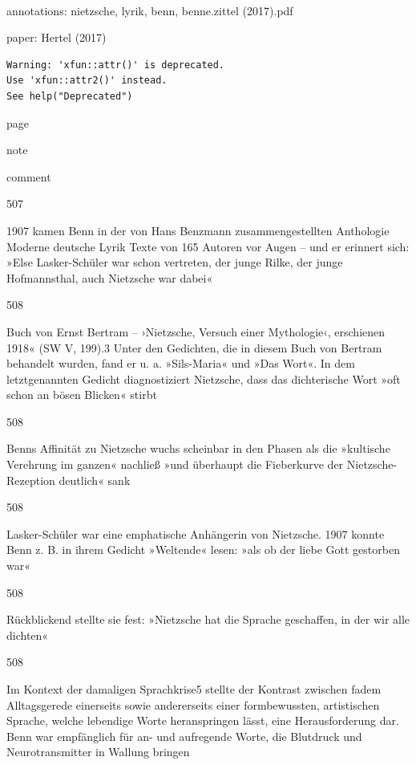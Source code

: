 \documentclass[
  letterpaper,
  DIV=11,
  numbers=noendperiod]{scrartcl}
\makeatletter
\let\oldparagraph\paragraph
\renewcommand{\paragraph}{
    \@ifstar
      \xxxParagraphStar
      \xxxParagraphNoStar
  }
\newcommand{\xxxParagraphStar}[1]{\oldparagraph*{#1}\mbox{}}
\newcommand{\xxxParagraphNoStar}[1]{\oldparagraph{#1}\mbox{}}
\makeatother
\begin{document}
\paragraph{annotations: nietzsche, lyrik, benn, benne.zittel
(2017).pdf}\label{annotations-nietzsche-lyrik-benn-benne.zittel-2017.pdf}

paper: Hertel (2017)

\begin{verbatim}
Warning: 'xfun::attr()' is deprecated.
Use 'xfun::attr2()' instead.
See help("Deprecated")
\end{verbatim}

page

note

comment

507

1907 kamen Benn in der von Hans Benzmann zusammengestellten Anthologie
Moderne deutsche Lyrik Texte von 165 Autoren vor Augen -- und er
erinnert sich: »Else Lasker-Schüler war schon vertreten, der junge
Rilke, der junge Hofmannsthal, auch Nietzsche war dabei«

508

Buch von Ernst Bertram -- ›Nietzsche, Versuch einer Mythologie‹,
erschienen 1918« (SW V, 199).3 Unter den Gedichten, die in diesem Buch
von Bertram behandelt wurden, fand er u. a. »Sils-Maria« und »Das Wort«.
In dem letztgenannten Gedicht diagnostiziert Nietzsche, dass das
dichterische Wort »oft schon an bösen Blicken« stirbt

508

Benns Affinität zu Nietzsche wuchs scheinbar in den Phasen als die
»kultische Verehrung im ganzen« nachließ »und überhaupt die Fieberkurve
der Nietzsche-Rezeption deutlich« sank

508

Lasker-Schüler war eine emphatische Anhängerin von Nietzsche. 1907
konnte Benn z. B. in ihrem Gedicht »Weltende« lesen: »als ob der liebe
Gott gestorben war«

508

Rückblickend stellte sie fest: »Nietzsche hat die Sprache geschaffen, in
der wir alle dichten«

508

Im Kontext der damaligen Sprachkrise5 stellte der Kontrast zwischen
fadem Alltagsgerede einerseits sowie andererseits einer formbewussten,
artistischen Sprache, welche lebendige Worte heranspringen lässt, eine
Herausforderung dar. Benn war empfänglich für an- und aufregende Worte,
die Blutdruck und Neurotransmitter in Wallung bringen
\end{document}
